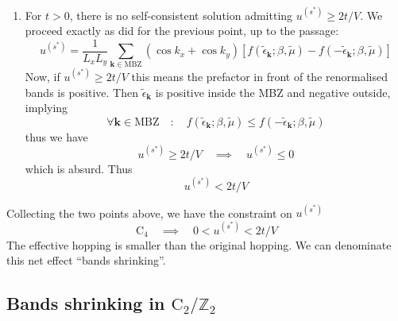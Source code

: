 \begin{enumerate}
	\[
	u^{(s^*)} > 0
	\]
	\item For $t>0$, there is no self-consistent solution admitting $u^{(s^*)} \ge 2t/V$. We proceed exactly as did for the previous point, up to the passage:
	\[
	u^{(s^*)} = \frac{1}{L_x L_y} \sum_{\mathbf{k}\in\mathrm{MBZ}} (\cos k_x + \cos k_y) \left[
	f(\tilde{\epsilon}_\mathbf{k};\beta,\tilde{\mu}) - f(-\tilde{\epsilon}_\mathbf{k};\beta,\tilde{\mu})
	\right]
	\]
	Now, if $u^{(s^*)} \ge 2t/V$ this means the prefactor in front of the renormalised bands is positive. Then $\tilde{\epsilon}_\mathbf{k}$ is positive inside the MBZ and negative outside, implying
	\[
	\forall \mathbf{k} \in \mathrm{MBZ}
	\quad\colon\quad
	f(\tilde{\epsilon}_\mathbf{k};\beta,\tilde{\mu}) \le f(-\tilde{\epsilon}_\mathbf{k};\beta,\tilde{\mu})
	\]
	thus we have
	\[
	u^{(s^*)} \ge 2t/V
	\quad\implies\quad
	u^{(s^*)} \le 0
	\]
	which is absurd. Thus
	\[
	u^{(s^*)} < 2t/V
	\]
\end{enumerate}
Collecting the two points above, we have the constraint on $u^{(s^*)}$
\begin{equation}\label{appeq:normal-us*-constraint}
	\mathrm{C}_4
	\quad\implies\quad
	0 < u^{(s^*)} < 2t/V
\end{equation}
The effective hopping is smaller than the original hopping. We can denominate this net effect ``bands shrinking''.

\subsection{Bands shrinking in $\mathrm{C}_2/\mathbb{Z}_2$}\label{appsubsec:normal-bands-shrinking-C2}

